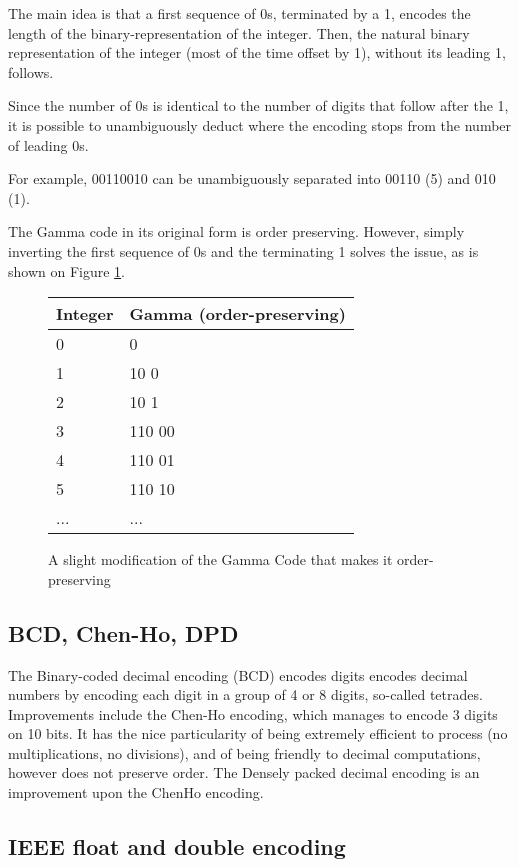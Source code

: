 \documentclass{acm_proc_article-sp}
\begin{document}
 The main idea is that a first sequence of 0s, terminated by a 1, encodes the length of the binary-representation of the integer. Then, the natural binary representation of the integer (most of the time offset by 1), without its leading 1, follows.

Since the number of 0s is identical to the number of digits that follow after the 1, it is possible to unambiguously deduct where the encoding stops from the number of leading 0s.

For example, 00110010 can be unambiguously separated into 00110 (5) and 010 (1).

The Gamma code in its original form is order preserving. However, simply inverting the first sequence of 0s and the terminating 1 solves the issue, as is shown on Figure \ref{figure-gamma-encoding-tweaked}.

\begin{figure}
\caption{A slight modification of the Gamma Code that makes it order-preserving}
\label{figure-gamma-encoding-tweaked}
\center
\begin{tabular}{|l|l|}
\hline
Integer & Gamma (order-preserving) \\
\hline
0 & 0 \\
\hline
1 & 10 0  \\
\hline
2 & 10 1  \\
\hline
3 & 110 00 \\
\hline
4 & 110 01 \\
\hline
5 & 110 10 \\
\hline
... & ... \\
\hline
\end{tabular}
\end{figure}

\subsection{BCD, Chen-Ho, DPD}

The Binary-coded decimal encoding (BCD) encodes digits encodes decimal numbers by encoding each digit in a group of 4 or 8 digits, so-called tetrades. Improvements include the Chen-Ho \cite{ChenHo} encoding, which manages to encode 3 digits on 10 bits. It has the nice particularity of being extremely efficient to process (no multiplications, no divisions), and of being friendly to decimal computations, however does not preserve order. The Densely packed decimal encoding \cite{DPD} is an improvement upon the ChenHo encoding.

\subsection{IEEE float and double encoding}
\end{document}
